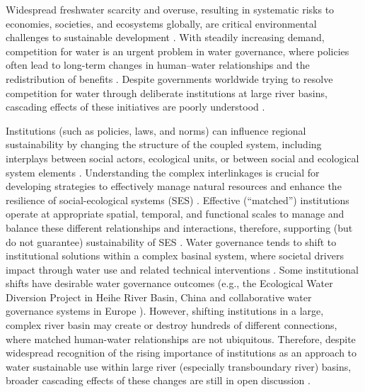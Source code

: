 Widespread freshwater scarcity and overuse, resulting in systematic risks to economies, societies, and ecosystems globally, are critical environmental challenges to sustainable development \cite{distefano2017, dolan2021, xu2020b, mekonnen2016}.
With steadily increasing demand, competition for water is an urgent problem in water governance, where policies often lead to long-term changes in human–water relationships and the redistribution of benefits \cite{gleick2010, ziolkowska2016, wang2019d}.
Despite governments worldwide trying to resolve competition for water through deliberate institutions at large river basins, cascading effects of these initiatives are poorly understood
\cite{giuliani2013, falkenmark2019, jaeger2019}.

Institutions (such as policies, laws, and norms) can influence regional sustainability by changing the structure of the coupled system, including interplays between social actors, ecological units, or between social and ecological system elements \cite{young2008,cumming2020b,lien2020, bodin2017b}.
Understanding the complex interlinkages is crucial for developing strategies to effectively manage natural resources and enhance the resilience of social-ecological systems (SES) \cite{kluger2020}.
Effective (“matched”) institutions operate at appropriate spatial, temporal, and functional scales to manage and balance these different relationships and interactions, therefore, supporting (but do not guarantee) sustainability of SES \cite{epstein2015, wang2019d}.
Water governance tends to shift to institutional solutions within a complex basinal system, where societal drivers impact through water use and related technical interventions \cite{fischer2020}.
Some institutional shifts have desirable water governance outcomes (e.g., the Ecological Water Diversion Project in Heihe River Basin, China \cite{wang2019d} and collaborative water governance systems in Europe \cite{green2013}).
However, shifting institutions in a large, complex river basin may create or destroy hundreds of different connections, where matched human-water relationships are not ubiquitous.
Therefore, despite widespread recognition of the rising importance of institutions as an approach to water sustainable use within large river (especially transboundary river) basins, broader cascading effects of these changes are still in open discussion \cite{agrawal2003, persha2011, agrawal2001}.

